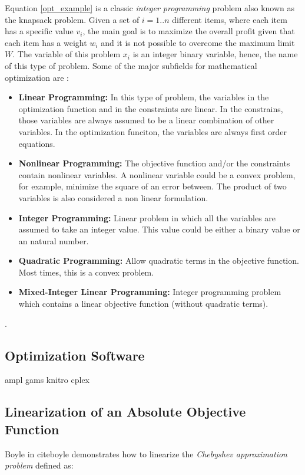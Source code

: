 Equation \eqref{opt_example} is a classic \textit{integer programming} problem also known as the knapsack problem. Given a set of $i = 1..n$ different items, where each item has a specific value $v_i$, the main goal is to maximize the overall profit given that each item has a weight $w_i$ and it is not possible to overcome the maximum limit $W$. The variable of this problem $x_i$ is an integer binary variable, hence, the name of this type of problem. Some of the major subfields for mathematical optimization are \cite{cplex, ampl}:
\begin{itemize}
    \item \textbf{Linear Programming:} In this type of problem, the variables in the optimization function and in the constraints are linear. In the constrains, those variables are always assumed to be a linear combination of other variables. In the optimization funciton, the variables are always first order equations.  
    \item \textbf{Nonlinear Programming:} The objective function and/or the constraints contain nonlinear variables. A nonlinear variable could be a convex problem, for example, minimize the square of an error between. The product of two variables is also considered a non linear formulation. 
    \item \textbf{Integer Programming:} Linear problem in which all the variables are assumed to take an integer value. This value could be either a binary value or an natural number. 
    \item \textbf{Quadratic Programming:} Allow quadratic terms in the objective function. Most times, this is a convex problem.
    \item \textbf{Mixed-Integer Linear Programming:} Integer programming problem which contains a linear objective function (without quadratic terms).
\end{itemize}

\cite{cplex}. 

\subsection{Optimization Software}
ampl
gams
knitro
cplex

\subsection{Linearization of an Absolute Objective Function}
Boyle in cite{boyle} demonstrates how to linearize the \textit{Chebyshev approximation problem} defined as:

